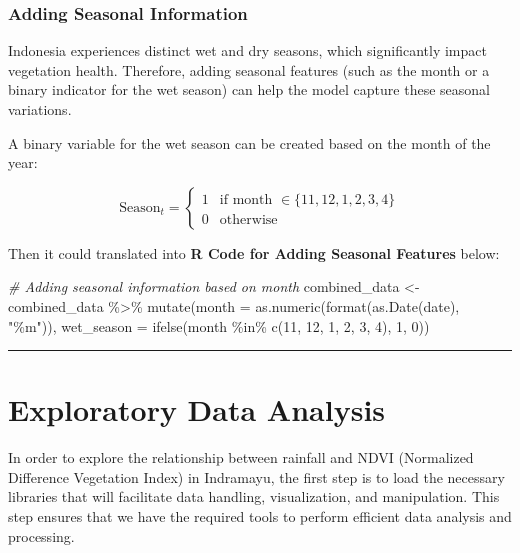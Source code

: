 \documentclass[
]{article}
\newenvironment{Shaded}{}{}
\newcommand{\AttributeTok}[1]{\textcolor[rgb]{0.49,0.56,0.16}{#1}}
\newcommand{\CommentTok}[1]{\textcolor[rgb]{0.38,0.63,0.69}{\textit{#1}}}
\newcommand{\DecValTok}[1]{\textcolor[rgb]{0.25,0.63,0.44}{#1}}
\newcommand{\FunctionTok}[1]{\textcolor[rgb]{0.02,0.16,0.49}{#1}}
\newcommand{\NormalTok}[1]{#1}
\newcommand{\OtherTok}[1]{\textcolor[rgb]{0.00,0.44,0.13}{#1}}
\newcommand{\SpecialCharTok}[1]{\textcolor[rgb]{0.25,0.44,0.63}{#1}}
\newcommand{\StringTok}[1]{\textcolor[rgb]{0.25,0.44,0.63}{#1}}
\begin{document}
\subsubsection{Adding Seasonal
Information}\label{adding-seasonal-information}

Indonesia experiences distinct wet and dry seasons, which significantly
impact vegetation health. Therefore, adding seasonal features (such as
the month or a binary indicator for the wet season) can help the model
capture these seasonal variations.

A binary variable for the wet season can be created based on the month
of the year:

\[
\text{Season}_t = 
    \begin{cases} 
    1 & \text{if month } \in \{11, 12, 1, 2, 3, 4\} \\
    0 & \text{otherwise}
    \end{cases}
\]

Then it could translated into \textbf{R Code for Adding Seasonal
Features} below:

\begin{Shaded}
\begin{Highlighting}[]
\CommentTok{\# Adding seasonal information based on month}
\NormalTok{combined\_data }\OtherTok{\textless{}{-}}\NormalTok{ combined\_data }\SpecialCharTok{\%\textgreater{}\%}
  \FunctionTok{mutate}\NormalTok{(}\AttributeTok{month =} \FunctionTok{as.numeric}\NormalTok{(}\FunctionTok{format}\NormalTok{(}\FunctionTok{as.Date}\NormalTok{(date), }\StringTok{"\%m"}\NormalTok{)),}
         \AttributeTok{wet\_season =} \FunctionTok{ifelse}\NormalTok{(month }\SpecialCharTok{\%in\%} \FunctionTok{c}\NormalTok{(}\DecValTok{11}\NormalTok{, }\DecValTok{12}\NormalTok{, }\DecValTok{1}\NormalTok{, }\DecValTok{2}\NormalTok{, }\DecValTok{3}\NormalTok{, }\DecValTok{4}\NormalTok{), }\DecValTok{1}\NormalTok{, }\DecValTok{0}\NormalTok{))}
\end{Highlighting}
\end{Shaded}

\begin{center}\rule{0.5\linewidth}{0.5pt}\end{center}

\section{Exploratory Data Analysis}\label{exploratory-data-analysis}

In order to explore the relationship between rainfall and NDVI
(Normalized Difference Vegetation Index) in Indramayu, the first step is
to load the necessary libraries that will facilitate data handling,
visualization, and manipulation. This step ensures that we have the
required tools to perform efficient data analysis and processing.
\end{document}
